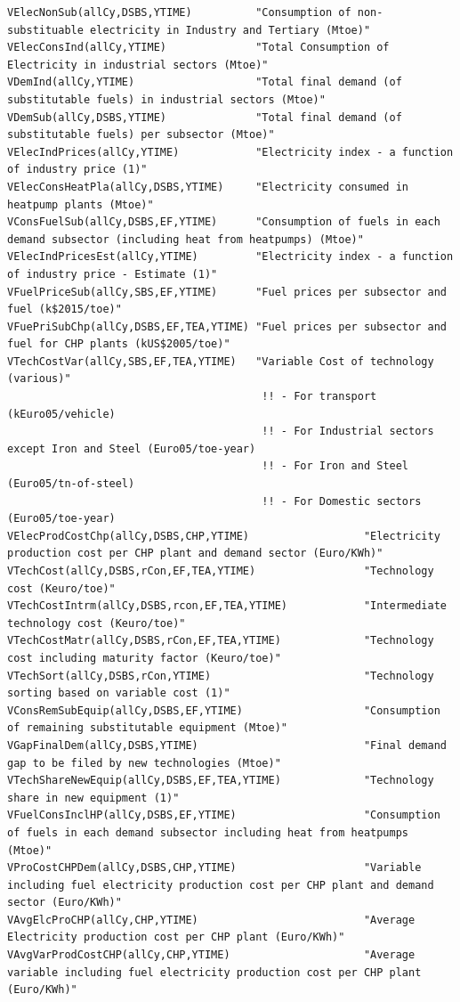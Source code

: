 \documentclass[a4paper,]{scrartcl}
\begin{document}
\begin{lstlisting}
VElecNonSub(allCy,DSBS,YTIME)          "Consumption of non-substituable electricity in Industry and Tertiary (Mtoe)"
VElecConsInd(allCy,YTIME)              "Total Consumption of Electricity in industrial sectors (Mtoe)"
VDemInd(allCy,YTIME)                   "Total final demand (of substitutable fuels) in industrial sectors (Mtoe)"
VDemSub(allCy,DSBS,YTIME)              "Total final demand (of substitutable fuels) per subsector (Mtoe)"
VElecIndPrices(allCy,YTIME)            "Electricity index - a function of industry price (1)"
VElecConsHeatPla(allCy,DSBS,YTIME)     "Electricity consumed in heatpump plants (Mtoe)"
VConsFuelSub(allCy,DSBS,EF,YTIME)      "Consumption of fuels in each demand subsector (including heat from heatpumps) (Mtoe)"
VElecIndPricesEst(allCy,YTIME)         "Electricity index - a function of industry price - Estimate (1)"
VFuelPriceSub(allCy,SBS,EF,YTIME)      "Fuel prices per subsector and fuel (k$2015/toe)"
VFuePriSubChp(allCy,DSBS,EF,TEA,YTIME) "Fuel prices per subsector and fuel for CHP plants (kUS$2005/toe)"
VTechCostVar(allCy,SBS,EF,TEA,YTIME)   "Variable Cost of technology (various)"
                                        !! - For transport (kEuro05/vehicle)
                                        !! - For Industrial sectors except Iron and Steel (Euro05/toe-year)
                                        !! - For Iron and Steel (Euro05/tn-of-steel)
                                        !! - For Domestic sectors (Euro05/toe-year)
VElecProdCostChp(allCy,DSBS,CHP,YTIME)                  "Electricity production cost per CHP plant and demand sector (Euro/KWh)"
VTechCost(allCy,DSBS,rCon,EF,TEA,YTIME)                 "Technology cost (Keuro/toe)"
VTechCostIntrm(allCy,DSBS,rcon,EF,TEA,YTIME)            "Intermediate technology cost (Keuro/toe)"
VTechCostMatr(allCy,DSBS,rCon,EF,TEA,YTIME)             "Technology cost including maturity factor (Keuro/toe)"
VTechSort(allCy,DSBS,rCon,YTIME)                        "Technology sorting based on variable cost (1)"
VConsRemSubEquip(allCy,DSBS,EF,YTIME)                   "Consumption of remaining substitutable equipment (Mtoe)"
VGapFinalDem(allCy,DSBS,YTIME)                          "Final demand gap to be filed by new technologies (Mtoe)"
VTechShareNewEquip(allCy,DSBS,EF,TEA,YTIME)             "Technology share in new equipment (1)"
VFuelConsInclHP(allCy,DSBS,EF,YTIME)                    "Consumption of fuels in each demand subsector including heat from heatpumps (Mtoe)"
VProCostCHPDem(allCy,DSBS,CHP,YTIME)                    "Variable including fuel electricity production cost per CHP plant and demand sector (Euro/KWh)"
VAvgElcProCHP(allCy,CHP,YTIME)                          "Average Electricity production cost per CHP plant (Euro/KWh)"
VAvgVarProdCostCHP(allCy,CHP,YTIME)                     "Average variable including fuel electricity production cost per CHP plant (Euro/KWh)"
\end{lstlisting}
\end{document}
